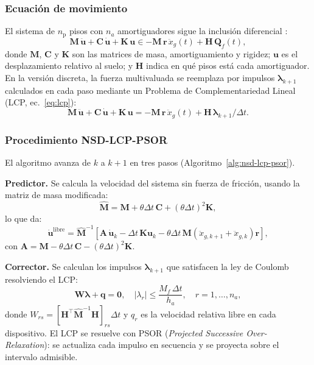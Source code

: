 \documentclass[preprint,12pt,authoryear]{elsarticle}
\newcommand{\np}{n_{\mathrm{p}}}
\newcommand{\Mf}{M_{\!f}}
\newcommand{\ha}{h_a}
\begin{document}
\subsubsection*{Ecuación de movimiento}

El sistema de $\np$ pisos con $n_a$ amortiguadores sigue la inclusión
diferencial \citep{Namorado2024}:
\begin{equation}
    \bm{M}\,\ddot{\bm{u}} + \bm{C}\,\dot{\bm{u}} + \bm{K}\,\bm{u}
    \in -\bm{M}\,\bm{r}\,\ddot{x}_g(t) + \bm{H}\,\bm{Q}_f(t),
    \label{eq:eom}
\end{equation}
donde $\bm{M}$, $\bm{C}$ y $\bm{K}$ son las matrices de masa,
amortiguamiento y rigidez; $\bm{u}$ es el desplazamiento relativo al suelo;
y $\bm{H}$ indica en qué pisos está cada amortiguador. En la versión
discreta, la fuerza multivaluada se reemplaza por impulsos
$\bm{\lambda}_{k+1}$ calculados en cada paso mediante un Problema de
Complementariedad Lineal (LCP, ec.~\ref{eq:lcp}):
\begin{equation}
    \bm{M}\,\ddot{\bm{u}} + \bm{C}\,\dot{\bm{u}} + \bm{K}\,\bm{u}
    = -\bm{M}\,\bm{r}\,\ddot{x}_g(t) + \bm{H}\,\bm{\lambda}_{k+1}/\Delta t.
    \label{eq:eom_disc}
\end{equation}

\subsubsection*{Procedimiento NSD-LCP-PSOR}

El algoritmo avanza de $k$ a $k+1$ en tres pasos
(Algoritmo~\ref{alg:nsd-lcp-psor}).

\textbf{Predictor.} Se calcula la velocidad del sistema sin fuerza de
fricción, usando la matriz de masa modificada:
\begin{equation}
    \hat{\bm{M}} = \bm{M}
                  + \theta\Delta t\,\bm{C}
                  + (\theta\Delta t)^{2}\bm{K},
    \label{eq:Mhat}
\end{equation}
lo que da:
\begin{equation}
    \dot{\bm{u}}^{\mathrm{libre}} = \hat{\bm{M}}^{-1}
    \!\left[
        \bm{A}\,\dot{\bm{u}}_k
        - \Delta t\,\bm{K}\bm{u}_k
        - \theta\Delta t\,\bm{M}\!\left(\ddot{x}_{g,k+1}+\ddot{x}_{g,k}\right)\bm{r}
    \right],
    \label{eq:vfree}
\end{equation}
con $\bm{A} = \bm{M} - \theta\Delta t\,\bm{C} - (\theta\Delta t)^{2}\bm{K}$.

\textbf{Corrector.} Se calculan los impulsos $\bm{\lambda}_{k+1}$ que
satisfacen la ley de Coulomb resolviendo el LCP:
\begin{equation}
    \bm{W}\bm{\lambda} + \bm{q} = \bm{0},
    \quad |\lambda_r| \leq \frac{\Mf\,\Delta t}{\ha},
    \quad r = 1,\ldots,n_a,
    \label{eq:lcp}
\end{equation}
donde $W_{rs} = [\bm{H}^{\top}\hat{\bm{M}}^{-1}\bm{H}]_{rs}\Delta t$ y
$q_r$ es la velocidad relativa libre en cada dispositivo. El LCP se resuelve
con PSOR (\textit{Projected Successive Over-Relaxation}): se actualiza cada
impulso en secuencia y se proyecta sobre el intervalo admisible.
\end{document}
